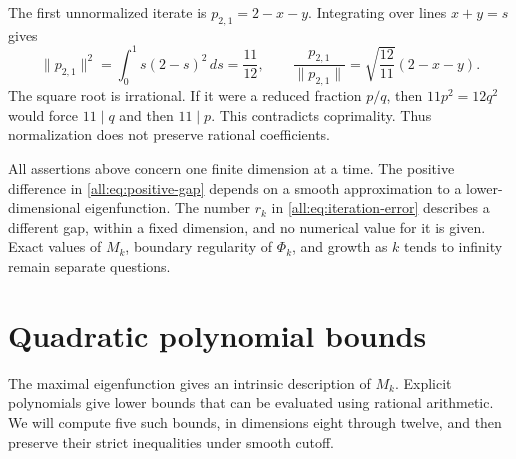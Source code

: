 \documentclass[11pt]{article}
\begin{document}
\begin{example}
The\label{all:ex:normalization} first unnormalized iterate is $p_{2,1}=2-x-y$.
Integrating over lines $x+y=s$ gives
\[
 \|p_{2,1}\|^2=\int_0^1s(2-s)^2\,ds=\frac{11}{12},\qquad
 \frac{p_{2,1}}{\|p_{2,1}\|}=\sqrt{\frac{12}{11}}(2-x-y).
\]
The square root is irrational.  If it were a reduced fraction $p/q$,
then $11p^2=12q^2$ would force $11\mid q$ and then $11\mid p$.
This contradicts coprimality.
Thus normalization does not preserve rational coefficients.
\end{example}

All assertions above concern one finite dimension at a time.
The positive difference in \eqref{all:eq:positive-gap} depends on a smooth
approximation to a lower-dimensional eigenfunction.
The number $r_k$ in \eqref{all:eq:iteration-error} describes a different gap,
within a fixed dimension, and no numerical value for it is given.
Exact values of $M_k$, boundary regularity of $\Phi_k$, and growth as
$k$ tends to infinity remain separate questions.


\section{Quadratic polynomial bounds}\label{var:section}

The maximal eigenfunction gives an intrinsic description of $M_k$.
Explicit polynomials give lower bounds that can be evaluated using rational
arithmetic.  We will compute five such bounds, in dimensions eight through
twelve, and then preserve their strict inequalities under smooth cutoff.
\end{document}
